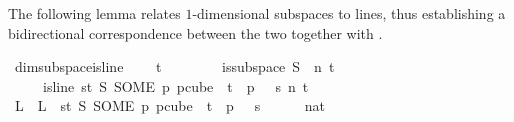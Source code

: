 \begin{isabellebody}
{\isafoldproof}%
%
\isadelimproof
%
\endisadelimproof
%
\begin{isamarkuptext}%
The following lemma relates $1$-dimensional subspaces to lines, thus establishing a bidirectional correspondence between the two together with .%
\end{isamarkuptext}\isamarkuptrue%
\isamarkupfalse%
\ dim{}{\isacharunderscore}{\kern0pt}subspace{\isacharunderscore}{\kern0pt}is{\isacharunderscore}{\kern0pt}line{\isacharcolon}{\kern0pt}\ \isanewline
\ \ \ {\isachardoublequoteopen}t\ {\isachargreater}{\kern0pt}\ {}{\isachardoublequoteclose}\ \isanewline
\ \ \ \ \ {\isachardoublequoteopen}is{\isacharunderscore}{\kern0pt}subspace\ S\ {}\ n\ t{\isachardoublequoteclose}\ \isanewline
\ \ \ \ \ {\isachardoublequoteopen}is{\isacharunderscore}{\kern0pt}line\ {\isacharparenleft}{\kern0pt}{\isasymlambda}s{\isasymin}{\isacharbraceleft}{\kern0pt}{\isachardot}{\kern0pt}{\isachardot}{\kern0pt}{\isacharless}{\kern0pt}t{\isacharbraceright}{\kern0pt}{\isachardot}{\kern0pt}\ S\ {\isacharparenleft}{\kern0pt}SOME\ p{\isachardot}{\kern0pt}\ p{\isasymin}cube\ {}\ t\ {\isasymand}\ p\ {}\ {\isacharequal}{\kern0pt}\ s{\isacharparenright}{\kern0pt}{\isacharparenright}{\kern0pt}\ n\ t{\isachardoublequoteclose}\isanewline
%
\isadelimproof
%
\endisadelimproof
%
\isatagproof
{}\isamarkupfalse%
{\isacharminus}{\kern0pt}\isanewline
\ \ \isamarkupfalse%
\ L\ \ {\isachardoublequoteopen}L\ {\isasymequiv}\ {\isacharparenleft}{\kern0pt}{\isasymlambda}s{\isasymin}{\isacharbraceleft}{\kern0pt}{\isachardot}{\kern0pt}{\isachardot}{\kern0pt}{\isacharless}{\kern0pt}t{\isacharbraceright}{\kern0pt}{\isachardot}{\kern0pt}\ S\ {\isacharparenleft}{\kern0pt}SOME\ p{\isachardot}{\kern0pt}\ p{\isasymin}cube\ {}\ t\ {\isasymand}\ p\ {}\ {\isacharequal}{\kern0pt}\ s{\isacharparenright}{\kern0pt}{\isacharparenright}{\kern0pt}{\isachardoublequoteclose}\isanewline
\ \ \isamarkupfalse%
\ {\isachardoublequoteopen}{\isacharbraceleft}{\kern0pt}{\isachardot}{\kern0pt}{\isachardot}{\kern0pt}{}{\isacharbraceright}{\kern0pt}\ {\isacharequal}{\kern0pt}\ {\isacharbraceleft}{\kern0pt}{}{\isacharcolon}{\kern0pt}{\isacharcolon}{\kern0pt}nat{\isacharcomma}{\kern0pt}\ {}{\isacharbraceright}{\kern0pt}{\isachardoublequoteclose}\ \isamarkupfalse%

\end{isabellebody}
